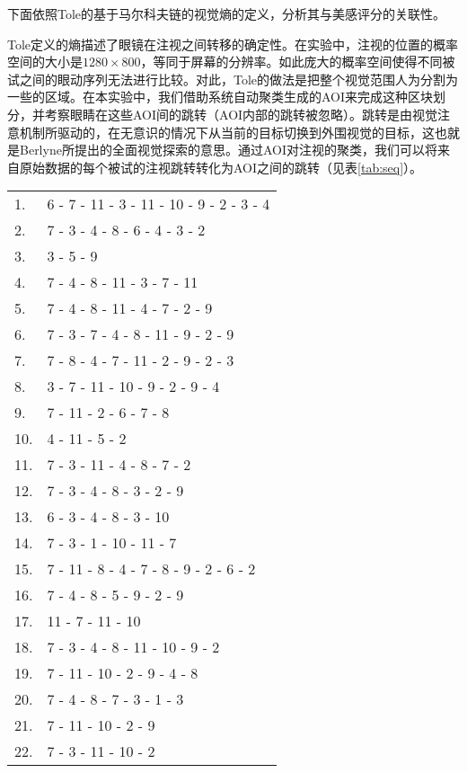 下面依照Tole的基于马尔科夫链的视觉熵的定义，分析其与美感评分的关联性。

Tole定义的熵描述了眼镜在注视之间转移的确定性。在实验中，注视的位置的概率空间的大小是$1280\times800$，等同于屏幕的分辨率。如此庞大的概率空间使得不同被试之间的眼动序列无法进行比较。对此，Tole的做法是把整个视觉范围人为分割为一些的区域。在本实验中，我们借助系统自动聚类生成的AOI来完成这种区块划分，并考察眼睛在这些AOI间的跳转（AOI内部的跳转被忽略）。跳转是由视觉注意机制所驱动的，在无意识的情况下从当前的目标切换到外围视觉的目标，这也就是Berlyne所提出的全面视觉探索的意思。通过AOI对注视的聚类，我们可以将来自原始数据的每个被试的注视跳转转化为AOI之间的跳转（见表\ref{tab:seq}）。

\begin{table}[H]
  \begin{tabular}{ll}
    1. & 6 - 7 - 11 - 3 - 11 - 10 - 9 - 2 - 3 - 4\\
    2. & 7 - 3 - 4 - 8 - 6 - 4 - 3 - 2\\
    3. & 3 - 5 - 9\\
    4. & 7 - 4 - 8 - 11 - 3 - 7 - 11\\
    5. & 7 - 4 - 8 - 11 - 4 - 7 - 2 - 9\\
    6. & 7 - 3 - 7 - 4 - 8 - 11 - 9 - 2 - 9\\
    7. & 7 - 8 - 4 - 7 - 11 - 2 - 9 - 2 - 3\\
    8. & 3 - 7 - 11 - 10 - 9 - 2 - 9 - 4\\
    9. & 7 - 11 - 2 - 6 - 7 - 8\\
    10.& 4 - 11 - 5 - 2\\
    11.& 7 - 3 - 11 - 4 - 8 - 7 - 2\\
    12.& 7 - 3 - 4 - 8 - 3 - 2 - 9\\
    13.& 6 - 3 - 4 - 8 - 3 - 10\\
    14.& 7 - 3 - 1 - 10 - 11 - 7\\
    15.& 7 - 11 - 8 - 4 - 7 - 8 - 9 - 2 - 6 - 2\\
    16.& 7 - 4 - 8 - 5 - 9 - 2 - 9\\
    17.& 11 - 7 - 11 - 10\\
    18.& 7 - 3 - 4 - 8 - 11 - 10 - 9 - 2\\
    19.& 7 - 11 - 10 - 2 - 9 - 4 - 8\\
    20.& 7 - 4 - 8 - 7 - 3 - 1 - 3\\
    21.& 7 - 11 - 10 - 2 - 9\\
    22.& 7 - 3 - 11 - 10 - 2\\

\end{tabular}
\end{table}
